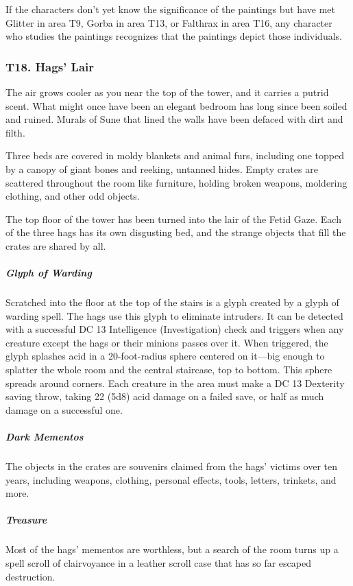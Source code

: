 \documentclass[10pt,a4paper,twoside,bg=print,twocolumn,openany,nodeprecatedcode]{dndbook}
\begin{document}
If the characters don't yet know the significance of the paintings but have met Glitter in area T9, Gorba in area T13, or Falthrax in area T16, any character who studies the paintings recognizes that the paintings depict those individuals.

\subsubsection{T18. Hags' Lair}
\begin{DndReadAloud}{}
The air grows cooler as you near the top of the tower, and it carries a putrid scent. What might once have been an elegant bedroom has long since been soiled and ruined. Murals of Sune that lined the walls have been defaced with dirt and filth.

Three beds are covered in moldy blankets and animal furs, including one topped by a canopy of giant bones and reeking, untanned hides. Empty crates are scattered throughout the room like furniture, holding broken weapons, moldering clothing, and other odd objects.

\end{DndReadAloud}

The top floor of the tower has been turned into the lair of the Fetid Gaze. Each of the three hags has its own disgusting bed, and the strange objects that fill the crates are shared by all.

\subparagraph{Glyph of Warding}
Scratched into the floor at the top of the stairs is a glyph created by a glyph of warding spell. The hags use this glyph to eliminate intruders. It can be detected with a successful DC 13 Intelligence (Investigation) check and triggers when any creature except the hags or their minions passes over it. When triggered, the glyph splashes acid in a 20-foot-radius sphere centered on it—big enough to splatter the whole room and the central staircase, top to bottom. This sphere spreads around corners. Each creature in the area must make a DC 13 Dexterity saving throw, taking 22 (5d8) acid damage on a failed save, or half as much damage on a successful one.

\subparagraph{Dark Mementos}
The objects in the crates are souvenirs claimed from the hags' victims over ten years, including weapons, clothing, personal effects, tools, letters, trinkets, and more.

\subparagraph{Treasure}
Most of the hags' mementos are worthless, but a search of the room turns up a spell scroll of clairvoyance in a leather scroll case that has so far escaped destruction.
\end{document}
